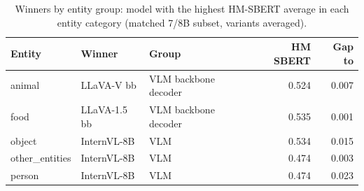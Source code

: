 \begin{table}[t]
\centering
\caption{Winners by entity group: model with the highest HM-SBERT average in each entity category (matched 7/8B subset, variants averaged).}
\label{tab:group_winners_entity}
\small
\begin{tabular}{lllrr}
\toprule
Entity & Winner & Group & HM SBERT & Gap to #2 \\
\midrule
animal & LLaVA-V bb & VLM backbone decoder & 0.524 & 0.007 \\
food & LLaVA-1.5 bb & VLM backbone decoder & 0.535 & 0.001 \\
object & InternVL-8B & VLM & 0.534 & 0.015 \\
other_entities & InternVL-8B & VLM & 0.474 & 0.003 \\
person & InternVL-8B & VLM & 0.474 & 0.023 \\
\bottomrule
\end{tabular}
\end{table}
